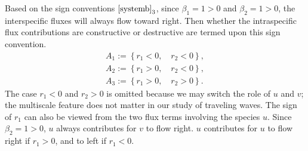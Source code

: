 \documentclass{amsart}
\theoremstyle{definition}
\numberwithin{equation}{section}
\begin{document}

Based on the sign conventions $\eqref{systemb}_3$, since $\beta_1=1>0$ and $\beta_2=1>0$, the interspecific fluxes will always flow toward right. Then whether the intraspecific flux contributions are constructive or destructive are termed upon this sign convention. 
\begin{equation} \label{classifications}
\begin{aligned}
 A_1:= \left\{r_1<0, \quad r_2<0 \right\},\\ %
 A_2:= \left\{r_1>0, \quad r_2<0 \right\},\\ %
 A_3:= \left\{r_1>0, \quad r_2>0 \right\}.%
\end{aligned}
\end{equation}
The case $r_1<0$ and $r_2>0$ is omitted because we may switch the role of $u$ and $v$; the multiscale feature does not matter in our study of traveling waves. The sign of $r_1$ can also be viewed from the two flux terms involving the species $u$. Since $\beta_2=1>0$, $u$ always contributes for $v$ to flow right. $u$ contributes for $u$ to flow right if $r_1>0$, and to left if $r_1<0$.
\end{document}
